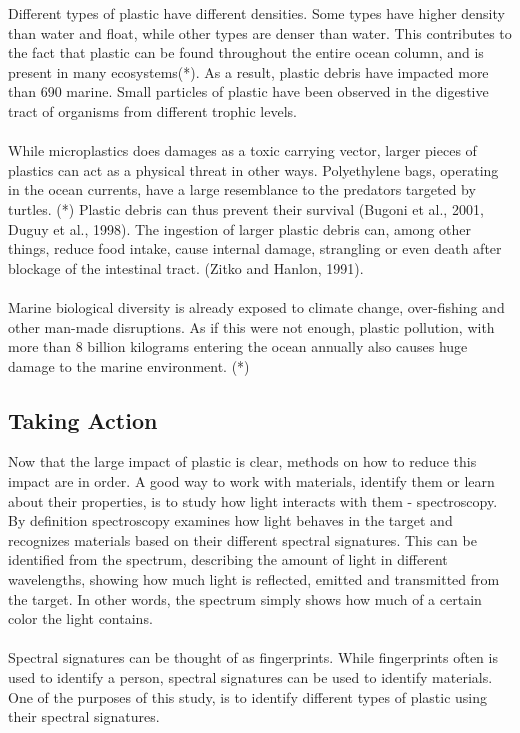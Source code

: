 Different types of plastic have different densities. Some types have higher density than water and float, while other types are denser than water. This contributes to the fact that plastic can be found throughout the entire ocean column, and is present in many ecosystems(*). As a result, plastic debris have impacted more than 690 marine. Small particles of plastic have been observed in the digestive tract of organisms from different trophic levels. 
\\\\
While microplastics does damages as a toxic carrying vector, larger pieces of plastics can act as a physical threat in other ways. Polyethylene bags, operating in the ocean currents, have a large resemblance to the predators targeted by turtles. (*) Plastic debris can thus prevent their survival (Bugoni et al., 2001, Duguy et al., 1998). The ingestion of larger plastic debris can, among other things, reduce food intake, cause internal damage, strangling or even death after blockage of the intestinal tract. (Zitko and Hanlon, 1991).
\\\\
Marine biological diversity is already exposed to climate change, over-fishing and other man-made disruptions. As if this were not enough, plastic pollution, with more than 8 billion kilograms entering the ocean annually
also causes huge damage to the marine environment. (*)

\subsection{Taking Action}
Now that the large impact of plastic is clear, methods on how to reduce this impact are in order. A good way to work with materials, identify them or learn about their properties, is to study how light interacts with them - spectroscopy. By definition spectroscopy examines how light behaves in the target and recognizes materials based on their different spectral signatures. This can be identified from the spectrum, describing the amount of light in different wavelengths, showing how much light is reflected, emitted and transmitted from the target. In other words, the spectrum simply shows how much of a certain color the light contains. 
\\\\
Spectral signatures can be thought of as fingerprints. While fingerprints often is used to identify a person, spectral signatures can be used to identify materials. One of the purposes of this study, is to identify different types of plastic using their spectral signatures. %

